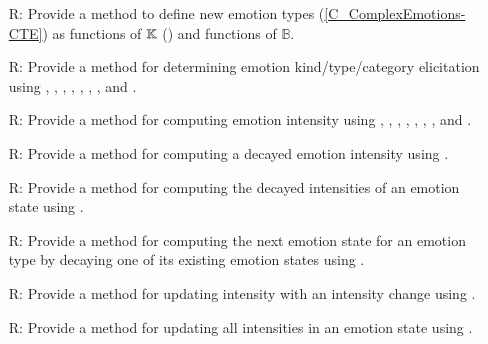 \begin{itemize}
    \item[R\refstepcounter{reqnum}\thereqnum \label{R_MixingEmotionsCTE}:]
    Provide a method to define new emotion types (\cref{C_ComplexEmotions-CTE})
    as functions of $\mathbb{K}$ () and functions
    of $\mathbb{B}$.

    \item[R\refstepcounter{reqnum}\thereqnum \label{R_GenerateEmotionCTE}:]
    Provide a method for determining emotion kind/type/category elicitation
    using , , ,
    , ,
    ,
    , and
    .

    \item[R\refstepcounter{reqnum}\thereqnum \label{R_CalculateIntensity}:]
    Provide a method for computing emotion intensity using
    , ,
    , ,
    , ,
    , and .

    \item[R\refstepcounter{reqnum}\thereqnum \label{R_DecayIntensity}:] Provide
    a method for computing a decayed emotion intensity using
    .

    \item[R\refstepcounter{reqnum}\thereqnum \label{R_DecayEmotion}:] Provide a
    method for computing the decayed intensities of an emotion state using
    .

    \item[R\refstepcounter{reqnum}\thereqnum \label{R_NewESFromDecay}:] Provide
    a method for computing the next emotion state for an emotion type by
    decaying one of its existing emotion states using
    .

    \item[R\refstepcounter{reqnum}\thereqnum \label{R_UpdateAnIntensity}:]
    Provide a method for updating intensity with an intensity change using
    .

    \item[R\refstepcounter{reqnum}\thereqnum \label{R_UpdateEmotionState}:]
    Provide a method for updating all intensities in an emotion state using
    .


\end{itemize}
